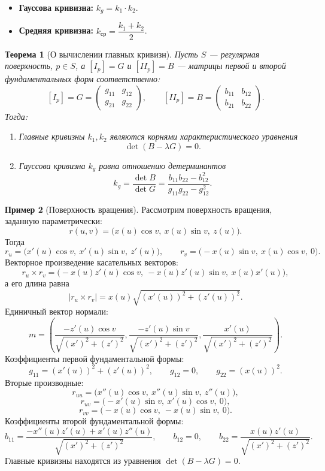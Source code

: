 \documentclass[12pt,a4paper]{article}
\newtheorem{theorem}{Теорема}[section]
\theoremstyle{definition}
\newtheorem{example}[theorem]{Пример}
\begin{document}
\begin{itemize}
    \item \textbf{Гауссова кривизна:} $k_g = k_1 \cdot k_2$.
    \item \textbf{Средняя кривизна:} $k_{\text{ср}} = \dfrac{k_1 + k_2}{2}$.
\end{itemize}

\begin{theorem}[О вычислении главных кривизн]
Пусть $S$ --- регулярная поверхность, $p \in S$, а $[I_p] = G$ и $[II_p] = B$ --- матрицы первой и второй фундаментальных форм соответственно:
\[
[I_p] = G = \begin{pmatrix} g_{11} & g_{12} \\ g_{21} & g_{22} \end{pmatrix}, \qquad
[II_p] = B = \begin{pmatrix} b_{11} & b_{12} \\ b_{21} & b_{22} \end{pmatrix}.
\]
Тогда:
\begin{enumerate}
    \item Главные кривизны $k_1, k_2$ являются корнями характеристического уравнения
    \[
    \det(B - \lambda G) = 0.
    \]
    \item Гауссова кривизна $k_g$ равна отношению детерминантов
    \[
    k_g = \frac{\det B}{\det G} = \frac{b_{11}b_{22} - b_{12}^2}{g_{11}g_{22} - g_{12}^2}.
    \]
\end{enumerate}
\end{theorem}

\begin{example}[Поверхность вращения]
Рассмотрим поверхность вращения, заданную параметрически:
\[
r(u, v) = \big(x(u)\cos v,\ x(u)\sin v,\ z(u)\big).
\]
Тогда
\[
r_u = \big(x'(u)\cos v,\ x'(u)\sin v,\ z'(u)\big),
\qquad
r_v = \big(-x(u)\sin v,\ x(u)\cos v,\ 0\big).
\]
Векторное произведение касательных векторов:
\[
r_u \times r_v = \big(-x(u)z'(u)\cos v,\ -x(u)z'(u)\sin v,\ x(u)x'(u)\big),
\]
а его длина равна
\[
|r_u \times r_v| = x(u)\sqrt{(x'(u))^2 + (z'(u))^2}.
\]
Единичный вектор нормали:
\[
m = \left(
\frac{-z'(u)\cos v}{\sqrt{(x')^2 + (z')^2}},
\frac{-z'(u)\sin v}{\sqrt{(x')^2 + (z')^2}},
\frac{x'(u)}{\sqrt{(x')^2 + (z')^2}}
\right).
\]
Коэффициенты первой фундаментальной формы:
\[
g_{11} = (x'(u))^2 + (z'(u))^2,\qquad g_{12} = 0,\qquad g_{22} = (x(u))^2.
\]
Вторые производные:
\[
r_{uu} = \big(x''(u)\cos v,\ x''(u)\sin v,\ z''(u)\big),
\]
\[
r_{uv} = \big(-x'(u)\sin v,\ x'(u)\cos v,\ 0\big),
\]
\[
r_{vv} = \big(-x(u)\cos v,\ -x(u)\sin v,\ 0\big).
\]
Коэффициенты второй фундаментальной формы:
\[
b_{11} = \frac{-x''(u)z'(u) + x'(u)z''(u)}{\sqrt{(x')^2 + (z')^2}},\qquad
b_{12} = 0,\qquad
b_{22} = \frac{x(u)z'(u)}{\sqrt{(x')^2 + (z')^2}}.
\]
Главные кривизны находятся из уравнения $\det(B - \lambda G)=0$.
\end{example}
\end{document}

